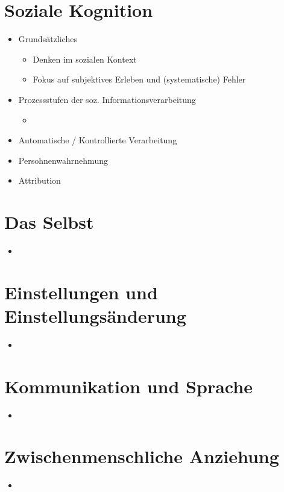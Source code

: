 \documentclass[11pt, paper=a4, twocolumn]{scrartcl}
\begin{document}
	\section{Soziale Kognition}
		\begin{itemize}
			\item Grundsätzliches
				\begin{itemize}
					\item Denken im sozialen Kontext
					\item Fokus auf subjektives Erleben und (systematische) Fehler
				\end{itemize}
			\item Prozessstufen der soz. Informationsverarbeitung
				\begin{itemize}
					\item 
				\end{itemize}

			\item Automatische / Kontrollierte Verarbeitung

			\item Persohnenwahrnehmung

			\item Attribution
		\end{itemize}


	\section{Das Selbst}
		\begin{itemize}
			\item 
		\end{itemize}

	\section{Einstellungen und Einstellungsänderung}
		\begin{itemize}
			\item
		\end{itemize}
	
	\section{Kommunikation und Sprache}
		\begin{itemize}
			\item
		\end{itemize}


	\section{Zwischenmenschliche Anziehung}
		\begin{itemize}
			\item
		\end{itemize}
\end{document}
